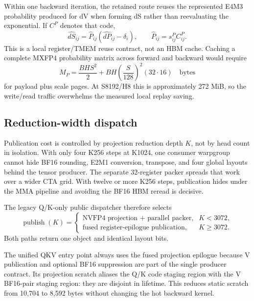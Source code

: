 Within one backward iteration, the retained route reuses the represented
E4M3 probability produced for dV when forming dS rather than reevaluating the
exponential.  If $C^P$ denotes that code,
\begin{equation}
  \widehat{dS}_{ij}=\widehat P_{ij}
    \left(\widehat{dP}_{ij}-\delta_i\right),\qquad
  \widehat P_{ij}=s^P_{ij}C^P_{ij}.
  \label{eq:represented-p-replay}
\end{equation}
This is a local register/TMEM reuse contract, not an HBM cache.  Caching a
complete MXFP4 probability matrix across forward and backward would require
\begin{equation}
  M_P=\frac{BHS^2}{2}
      +BH\left(\frac{S}{128}\right)^2(32\cdot16)
      \quad\text{bytes}
  \label{eq:probability-cache-bytes}
\end{equation}
for payload plus scale pages.  At S8192/H8 this is approximately 272 MiB, so
the write/read traffic overwhelms the measured local replay saving.

\subsection{Reduction-width dispatch}

Publication cost is controlled by projection reduction depth $K$, not by head
count in isolation.  With only four K256 steps at K1024, one consumer
warpgroup cannot hide BF16 rounding, E2M1 conversion, transpose, and four
global layouts behind the tensor producer.  The separate 32-register packer
spreads that work over a wider CTA grid.  With twelve or more K256 steps,
publication hides under the MMA pipeline and avoiding the BF16 HBM reread is
decisive.

The legacy Q/K-only public dispatcher therefore selects
\begin{equation}
  \operatorname{publish}(K)=
  \begin{cases}
    \text{NVFP4 projection + parallel packer},&K<3072,\\
    \text{fused register-epilogue publication},&K\ge3072.
  \end{cases}
  \label{eq:projection-dispatch}
\end{equation}
Both paths return one  object and identical
layout bits.

The unified QKV entry point always uses the fused projection epilogue because
V publication and optional BF16 suppression are part of the single producer
contract.  Its projection scratch aliases the Q/K code staging region with
the V BF16-pair staging region: they are disjoint in lifetime.  This reduces
static scratch from 10,704 to 8,592 bytes without changing the hot backward
kernel.

